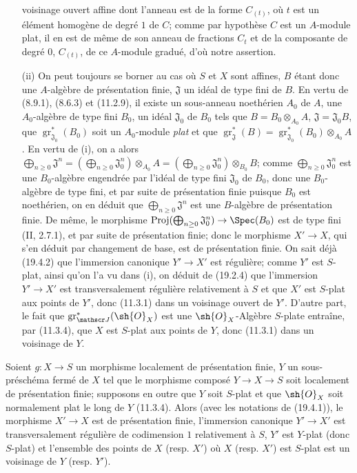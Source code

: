 \begin{enumerate}
voisinage ouvert affine dont l'anneau est de la forme $C_{(t)}$, où $t$ est un élément homogène de degré $1$ de $C$; comme par hypothèse $C$ est un $A$-module plat, il en est de même de son anneau de fractions $C_t$ et de la composante de degré $0$, $C_{(t)}$, de ce $A$-module gradué, d'où notre assertion.
  \item[(ii)] On peut toujours se borner au cas où $S$ et $X$ sont affines, $B$ étant donc une $A$-algèbre de présentation finie, $\mathfrak J$ un idéal de type fini de $B$. En vertu de (8.9.1), (8.6.3) et (11.2.9), il existe un sous-anneau noethérien $A_0$ de $A$, une $A_0$-algèbre de type fini $B_0$, un idéal $\mathfrak J_0$ de $B_0$ tels que $B=B_0\otimes_{A_0}A$, $\mathfrak J=\mathfrak J_0B$, que $\operatorname{gr}_{\mathfrak J_0}^*(B_0)$ soit un $A_0$-module \emph{plat} et que $\operatorname{gr}_{\mathfrak J}^*(B)=\operatorname{gr}_{\mathfrak J_0}^*(B_0)\otimes_{A_0}A$. En vertu de (i), on a alors $\bigoplus_{n\geq0}\mathfrak J^n=(\bigoplus_{n\geq0}\mathfrak J_0^n)\otimes_{A_0}A=(\bigoplus_{n\geq0}\mathfrak J_0^n)\otimes_{B_0}B$; comme $\bigoplus_{n\geq0}\mathfrak J_0^n$ est une $B_0$-algèbre engendrée par l'idéal de type fini $\mathfrak J_0$ de $B_0$, donc une $B_0$-algèbre de type fini, et par suite de présentation finie puisque $B_0$ est noethérien, on en déduit que $\bigoplus_{n\geq0}\mathfrak J^n$ est une $B$-algèbre de présentation finie. De même, le morphisme $\operatorname{Proj}(\bigoplus_{n\geq0}\mathfrak J_0^n)\to\Spec(B_0)$ est de type fini (II, 2.7.1), et par suite de présentation finie; donc le morphisme $X'\to X$, qui s'en déduit par changement de base, est de présentation finie. On sait déjà (19.4.2) que l'immersion canonique $Y'\to X'$ est régulière; comme $Y'$ est $S$-plat, ainsi qu'on l'a vu dans (i), on déduit de (19.2.4) que l'immersion $Y'\to X'$ est transversalement régulière relativement à $S$ et que $X'$ est $S$-plat aux points de $Y'$, donc (11.3.1) dans un voisinage ouvert de $Y'$. D'autre part, le fait que $\operatorname{gr}_{\mathscr J}^*(\sh{O}_X)$ est une $\sh{O}_X$-Algèbre $S$-plate entraîne, par (11.3.4), que $X$ est $S$-plat aux points de $Y$, donc (11.3.1) dans un voisinage de $Y$.
\end{enumerate}

\begin{corollary}[19.4.7]
\label{IV.19.4.7}
Soient $g:X\to S$ un morphisme localement de présentation finie, $Y$ un sous-préschéma fermé de $X$ tel que le morphisme composé $Y\to X\to S$ soit localement de présentation finie; supposons en outre que $Y$ soit $S$-plat et que $\sh{O}_X$ soit normalement plat le long de $Y$ (11.3.4). Alors (avec les notations de (19.4.1)), le morphisme $X'\to X$ est de présentation finie, l'immersion canonique $Y'\to X'$ est transversalement régulière de codimension $1$ relativement à $S$, $Y'$ est $Y$-plat (donc $S$-plat) et l'ensemble des points de $X$ (resp. $X'$) où $X$ (resp. $X'$) est $S$-plat est un voisinage de $Y$ (resp. $Y'$).
\end{corollary}

